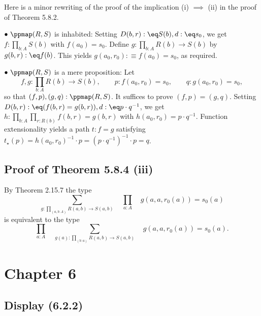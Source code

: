 \documentclass[12pt]{article}
\begin{document}
Here is a minor rewriting of the proof of the implication (i) $\implies$ (ii) in the proof of Theorem 5.8.2. 

\nn$\bullet\ \ppmap(R,S)$ is inhabited: Setting $D(b,r):\eq S(b),d:\eq s_0$, we get $f:\prod_{b:A}S(b)$ with $f(a_0)=s_0$. Define $g:\prod_{b:A}R(b)\to S(b)$ by $g(b,r):\eq f(b)$. This yields $g(a_0,r_0):\equiv f(a_0)=s_0$, as required. 

\nn$\bullet\ \ppmap(R,S)$ is a mere proposition: Let 
$$
f,g:\prod_{b:A}R(b)\to S(b),\qquad p:f(a_0,r_0)=s_0,\qquad q:g(a_0,r_0)=s_0,
$$ 
so that $(f,p),(g,q):\ppmap(R,S)$. It suffices to prove $(f,p)=(g,q)$. Setting $D(b,r):\eq(f(b,r)=g(b,r)),d:\eq p\cdot q^{-1}$, we get $h:\prod_{b:A}\prod_{r:R(b)}f(b,r)=g(b,r)$ with $h(a_0,r_0)=p\cdot q^{-1}$. Function extensionality yields a path $t:f=g$ satisfying $t_\star(p)=h(a_0,r_0)^{-1}\cdot p=(p\cdot q^{-1})^{-1}\cdot p=q$.%


\subsection{Proof of Theorem 5.8.4 (iii)}

By Theorem 2.15.7 the type 
$$
\sum_{g:\prod_{(a,b:A)}R(a,b)\to S(a,b)}\quad\prod_{a:A}\quad g(a,a,r_0(a))=s_0(a)
$$ 
is equivalent to the type
$$
\prod_{a:A}\quad\sum_{g(a):\prod_{(b:a)}R(a,b)\to S(a,b)}\quad g(a,a,r_0(a))=s_0(a).
$$






\section{Chapter 6}

\subsection{Display (6.2.2)}
\end{document}
